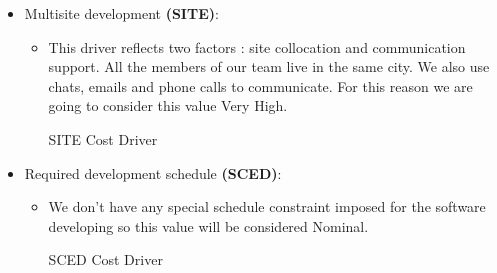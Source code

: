 \begin{itemize}
	\item Multisite development \textbf{(SITE)}: 
	\begin{itemize}
	\item[]This driver reflects two factors : site collocation and communication support. All the members of our team live in the same city. We also use chats, emails and phone calls to communicate. For this reason we are going to consider this value \textsf{Very High}.

	\begin{costdriverstable}{SITE Cost Driver}
		\hline
	\end{costdriverstable}
	
	\end{itemize}
\end{itemize}

\begin{itemize}
	\item Required development schedule \textbf{(SCED)}: 
	\begin{itemize}
	\item[] We don't have any special schedule constraint imposed for the software developing so this value will be considered \textsf{Nominal}.
	\begin{costdriverstable}{SCED Cost Driver}
		\hline
	\end{costdriverstable}
	\end{itemize}
\end{itemize}

